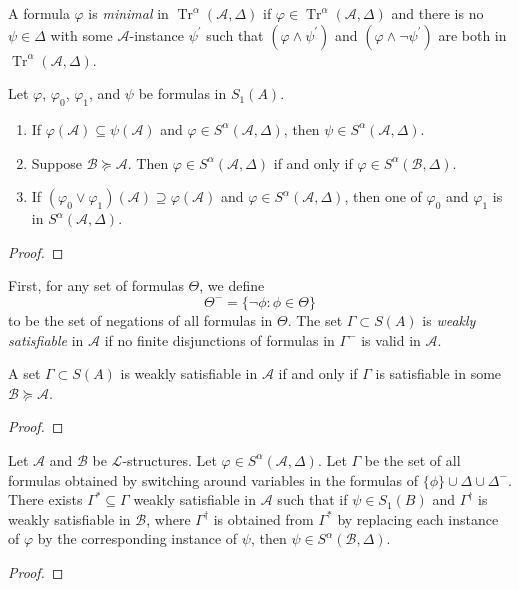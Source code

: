 \documentclass{article}
\DeclareMathOperator{\Tr}{Tr}
\let\mc\mathcal
\begin{document}
\begin{definition}[Minimality]
    A formula $\varphi$ is \textit{minimal} in $\Tr^{\alpha}(\mc{A}, \Delta)$ if $\varphi \in \Tr^{\alpha}(\mc{A}, \Delta)$ and there is no $\psi \in \Delta$ with some $\mc{A}$-instance $\psi^{\prime}$ such that $(\varphi \land \psi^{\prime})$ and $(\varphi \land \neg \psi^{\prime})$ are both in $\Tr^{\alpha}(\mc{A}, \Delta)$.
\end{definition}

\begin{lemma}\label{pRank}
    Let $\varphi$, $\varphi_0$, $\varphi_1$, and $\psi$ be formulas in $S_1(A)$.
    \begin{enumerate}
        \item If $\varphi(\mc{A}) \subseteq \psi(\mc{A})$ and $\varphi \in S^{\alpha}(\mc{A}, \Delta)$, then $\psi \in S^{\alpha}(\mc{A}, \Delta)$.
        \item Suppose $\mc{B} \succeq \mc{A}$. Then $\varphi \in S^{\alpha}(\mc{A}, \Delta)$ if and only if $\varphi \in S^{\alpha}(\mc{B}, \Delta)$.
        \item If $(\varphi_0 \lor \varphi_1)(\mc{A}) \supseteq \varphi(\mc{A})$ and $\varphi \in S^{\alpha}(\mc{A}, \Delta)$, then one of $\varphi_0$ and $\varphi_1$ is in $S^{\alpha}(\mc{A}, \Delta)$.
    \end{enumerate}
\end{lemma}
\begin{proof}
\end{proof}

\begin{definition}
    First, for any set of formulas $\Theta$, we define
    \[ \Theta^{-} = \{ \neg \phi : \phi \in \Theta \} \]
    to be the set of negations of all formulas in $\Theta$. The set $\Gamma \subset S(A)$ is \textit{weakly satisfiable} in $\mc{A}$ if no finite disjunctions of formulas in $\Gamma^{-}$ is valid in $\mc{A}$.
\end{definition}

\begin{remark}\label{wSat}
    A set $\Gamma \subset S(A)$ is weakly satisfiable in $\mc{A}$ if and only if $\Gamma$ is satisfiable in some $\mc{B} \succeq \mc{A}$.
\end{remark}
\begin{proof}
\end{proof}

\begin{lemma}\label{gStar}
    Let $\mc{A}$ and $\mc{B}$ be $\mc{L}$-structures. Let $\varphi \in S^{\alpha}(\mc{A}, \Delta)$. Let $\Gamma$ be the set of all formulas obtained by switching around variables in the formulas of $\{ \phi \} \cup \Delta \cup \Delta^{-}$. There exists $\Gamma^{\ast} \subseteq \Gamma$ weakly satisfiable in $\mc{A}$ such that if $\psi \in S_1(B)$ and $\Gamma^{\dagger}$ is weakly satisfiable in $\mc{B}$, where $\Gamma^{\dagger}$ is obtained from $\Gamma^{\ast}$ by replacing each instance of $\varphi$ by the corresponding instance of $\psi$, then $\psi \in S^{\alpha}(\mc{B}, \Delta)$.
\end{lemma}
\begin{proof}
\end{proof}
\end{document}

